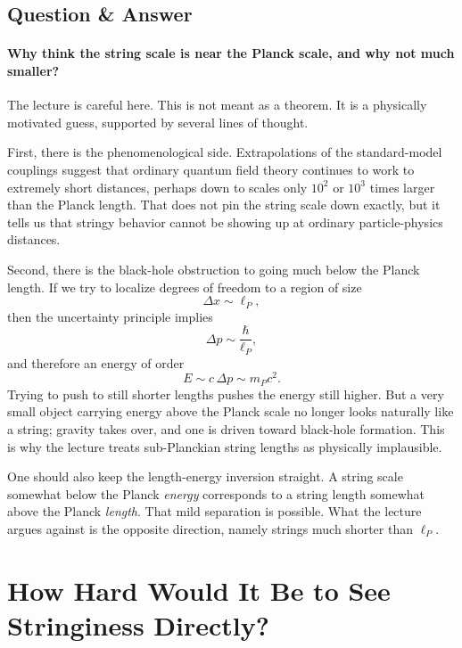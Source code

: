 \subsection{Question \& Answer}

\paragraph{Why think the string scale is near the Planck scale, and why not much smaller?}

The lecture is careful here. This is not meant as a theorem. It is a physically motivated guess, supported by several lines of thought.

First, there is the phenomenological side. Extrapolations of the standard-model couplings suggest that ordinary quantum field theory continues to work to extremely short distances, perhaps down to scales only \(10^{2}\) or \(10^{3}\) times larger than the Planck length. That does not pin the string scale down exactly, but it tells us that stringy behavior cannot be showing up at ordinary particle-physics distances.

Second, there is the black-hole obstruction to going much below the Planck length. If we try to localize degrees of freedom to a region of size
\begin{equation}
\Delta x\sim \ell_{P},
\end{equation}
then the uncertainty principle implies
\begin{equation}
\Delta p\sim \frac{\hbar}{\ell_{P}},
\end{equation}
and therefore an energy of order
\begin{equation}
E\sim c\,\Delta p\sim m_{P}c^{2}.
\end{equation}
Trying to push to still shorter lengths pushes the energy still higher. But a very small object carrying energy above the Planck scale no longer looks naturally like a string; gravity takes over, and one is driven toward black-hole formation. This is why the lecture treats sub-Planckian string lengths as physically implausible.

One should also keep the length-energy inversion straight. A string scale somewhat below the Planck \emph{energy} corresponds to a string length somewhat above the Planck \emph{length}. That mild separation is possible. What the lecture argues against is the opposite direction, namely strings much shorter than \(\ell_{P}\).

\section{How Hard Would It Be to See Stringiness Directly?}


